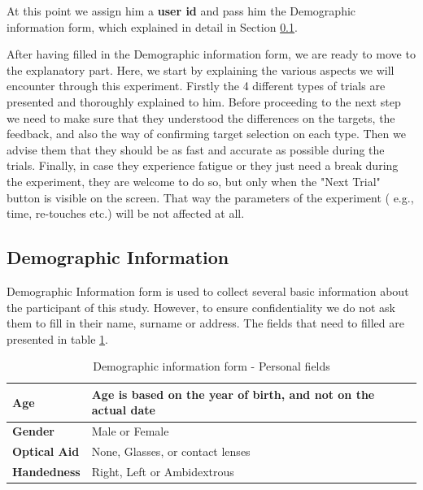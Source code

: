 At this point we assign him a \textbf{user id} and pass him the Demographic information form, which explained in detail in Section \ref{sec:demographic}.

After having filled in the Demographic information form, we are ready to move to the explanatory part. Here, we start by explaining the various aspects we will encounter through this experiment. Firstly the 4 different types of trials are presented and thoroughly explained to him. Before proceeding to the next step we need to make sure that they understood the differences on the targets, the feedback, and also the way of confirming target selection on each type. Then we advise them that they should be as fast and accurate as possible during the trials. Finally, in case they experience fatigue or they just need a break during the experiment, they are welcome to do so, but only when the "Next Trial" button is visible on the screen. That way the parameters of the experiment ( e.g., time, re-touches etc.) will be not affected at all.




\subsection{Demographic Information}
\label{sec:demographic}

Demographic Information form is used to collect several basic information about the participant of this study. However, to ensure confidentiality we do not ask them to fill in their  name, surname or address. The fields that need to filled are presented in table \ref{tab:demoPersonalFields}.



\begin{table}[H]
\centering
\begin{tabular}{l | l}
\textbf{Age} & Age is based on the year of birth, and not on the actual date \\
\hline
\textbf{Gender} & Male or Female \\
\hline
\textbf{Optical Aid} & None, Glasses, or contact lenses \\
\hline
\textbf{Handedness} & Right, Left or Ambidextrous \\
\end{tabular}
\caption{Demographic information form - Personal fields}
\label{tab:demoPersonalFields}
\end{table}

